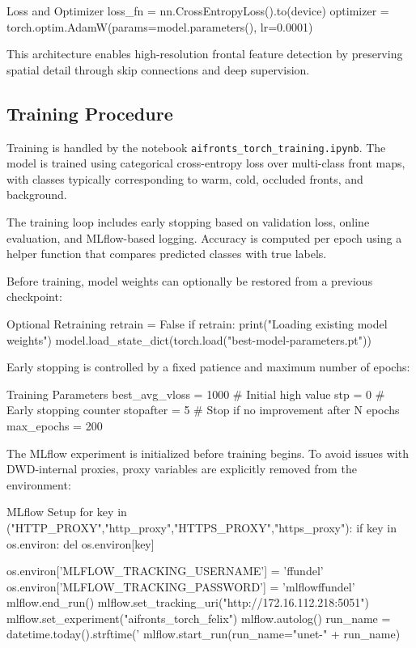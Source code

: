 \begin{codeonly}{Loss and Optimizer}
loss_fn   = nn.CrossEntropyLoss().to(device)
optimizer = torch.optim.AdamW(params=model.parameters(), lr=0.0001)
\end{codeonly}

This architecture enables high-resolution frontal feature detection by preserving spatial detail through skip connections and deep supervision.


\subsection{Training Procedure}

Training is handled by the notebook \texttt{aifronts\_torch\_training.ipynb}. The model is trained using categorical cross-entropy loss over multi-class front maps, with classes typically corresponding to warm, cold, occluded fronts, and background. 

The training loop includes early stopping based on validation loss, online evaluation, and MLflow-based logging. Accuracy is computed per epoch using a helper function that compares predicted classes with true labels.

Before training, model weights can optionally be restored from a previous checkpoint:

\begin{codeonly}{Optional Retraining}
retrain = False
if retrain:
    print("Loading existing model weights")
    model.load_state_dict(torch.load("best-model-parameters.pt"))
\end{codeonly}

Early stopping is controlled by a fixed patience and maximum number of epochs:

\begin{codeonly}{Training Parameters}
best_avg_vloss = 1000  # Initial high value
stp            = 0     # Early stopping counter
stopafter      = 5     # Stop if no improvement after N epochs
max_epochs     = 200
\end{codeonly}

The MLflow experiment is initialized before training begins. To avoid issues with DWD-internal proxies, proxy variables are explicitly removed from the environment:

\begin{codeonly}{MLflow Setup}
for key in ("HTTP_PROXY","http_proxy","HTTPS_PROXY","https_proxy"):
    if key in os.environ:
        del os.environ[key]

os.environ['MLFLOW_TRACKING_USERNAME'] = 'ffundel'
os.environ['MLFLOW_TRACKING_PASSWORD'] = 'mlflowffundel'
mlflow.end_run()
mlflow.set_tracking_uri("http://172.16.112.218:5051")
mlflow.set_experiment("aifronts_torch_felix")
mlflow.autolog()
run_name = datetime.today().strftime('%
mlflow.start_run(run_name="unet-" + run_name)
\end{codeonly}

